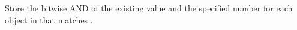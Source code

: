Store the bitwise AND of the existing value and the specified number for
each object in  that matches .


